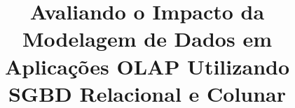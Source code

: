 \documentclass[conference]{IEEEtran}
\begin{document}
%
\title{Avaliando o Impacto da Modelagem de Dados em Aplicações OLAP Utilizando SGBD Relacional e Colunar}



% 


\end{document}
